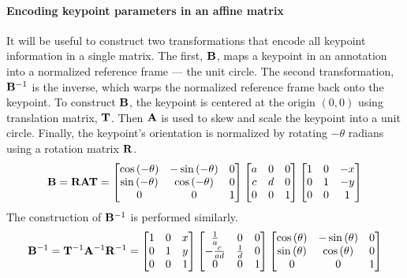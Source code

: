         \paragraph{Encoding keypoint parameters in an affine matrix}
        It will be useful to construct two transformations that encode
          all keypoint information in a single matrix.
        The first, $\mathbf{B}$, maps a keypoint in an annotation into a
          normalized reference frame --- the unit circle.
        The second transformation, $\mathbf{B}^{-1}$ is the inverse, which
          warps the normalized reference frame back onto the keypoint.
        To construct $\mathbf{B}$, the keypoint is centered at the origin
          $(0, 0)$ using translation matrix, $\mathbf{T}$.
        Then $\mathbf{A}$ is used to skew and scale the keypoint into a unit
          circle.
        Finally, the keypoint's orientation is normalized by rotating
          $-\theta$ radians using a rotation matrix $\mathbf{R}$.
        \begin{equation}\label{eqn:RVTConstruct}
            \mathbf{B}=\mathbf{R} \mathbf{A} \mathbf{T} =  \left[ \begin{matrix}  \cos{\left(-\theta\right)} & -\sin{\left(-\theta\right)} & 0\\ \sin{\left(-\theta\right)} & \cos{\left(-\theta\right)} & 0\\ 0 & 0 & 1  \end{matrix} \right]   \left[ \begin{matrix} a & 0 & 0\\c & d & 0 \\ 0 & 0 & 1 \end{matrix} \right]   \left[ \begin{matrix}  1 & 0 & -x\\ 0 & 1 & -y\\ 0 & 0 & 1  \end{matrix} \right] 
        \end{equation}
        The construction of $\mathbf{B}^{-1}$ is performed similarly.
        \begin{equation}\label{eqn:invTVRConstruct}
             \mathbf{B}^{-1} = \mathbf{T}^{-1} \mathbf{A}^{-1} \mathbf{R}^{-1} = 
              \left[ \begin{matrix}  1 & 0 & x\\ 0 & 1 & y\\ 0 & 0 & 1  \end{matrix} \right] 
              \left[ \begin{matrix} 
                \frac{1}{a}     & 0               & 0\\
                -\frac{c}{a d}  & \frac{1}{d}     & 0\\
                0               & 0               & 1
                 \end{matrix} \right] 
              \left[ \begin{matrix}  \cos{\left(\theta\right)} & -\sin{\left(\theta\right)} & 0\\ \sin{\left(\theta\right)} & \cos{\left(\theta\right)} & 0\\ 0 & 0 & 1  \end{matrix} \right] 
        \end{equation}

